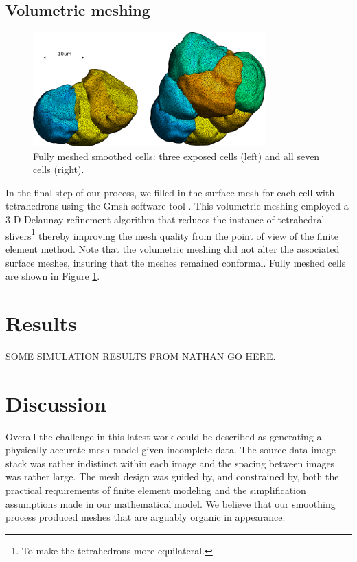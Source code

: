 \documentclass[a4paper,10pt]{article}
\begin{document}
\subsection{Volumetric meshing}

\begin{figure}[H]
\begin{center}
\includegraphics[width=0.8\textwidth]{images/smooth.pdf}
\end{center}
\caption{Fully meshed smoothed cells: three exposed cells (left) and all seven cells (right).}
\label{fig:smooth}
\end{figure}

In the final step of our process, we filled-in the surface mesh for each cell with tetrahedrons using the Gmsh software tool \cite{NME:NME2579}. This volumetric meshing employed a 3-D Delaunay refinement algorithm that reduces the instance of tetrahedral slivers\footnote{To make the tetrahedrons more equilateral.} thereby improving the mesh quality from the point of view of the finite element method. Note that the volumetric meshing did not alter the associated surface meshes, insuring that the meshes remained conformal. Fully meshed cells are shown in Figure \ref{fig:smooth}.\\

\section{Results}

SOME SIMULATION RESULTS FROM NATHAN GO HERE.\\

\section{Discussion}

Overall the challenge in this latest work could be described as generating a physically accurate mesh model given incomplete data. The source data image stack was rather indistinct within each image and the spacing between images was rather large. The mesh design was guided by, and constrained by, both the practical requirements of finite element modeling and the simplification assumptions made in our mathematical model. We believe that our smoothing process produced meshes that are arguably organic in appearance.\\ 
\end{document}
